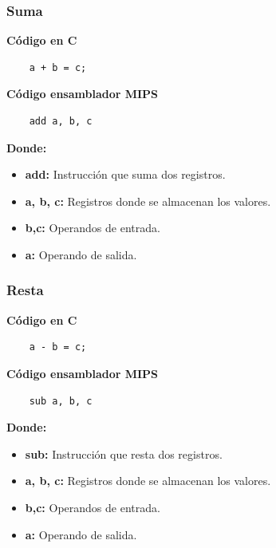 \documentclass{templateNote}
\begin{document}
\subsubsection{Suma}
\begin{tcolorbox}[colback=gray!5!white, colframe=gray!75!black, title={Código de ejemplo en C y ensamblador MIPS}]
    \begin{minipage}{0.45\textwidth}
        \textbf{Código en C}
        \begin{lstlisting}
    a + b = c;
        \end{lstlisting}
    \end{minipage}
    \hfill
    \begin{minipage}{0.45\textwidth}
        \textbf{Código ensamblador MIPS}
        \begin{lstlisting}
    add a, b, c
        \end{lstlisting}
    \end{minipage}
\end{tcolorbox}

\textbf{Donde:}
\begin{itemize}
    \item \textbf{add:} Instrucción que suma dos registros.
    \item \textbf{a, b, c:} Registros donde se almacenan los valores.
    \item \textbf{b,c:} Operandos de entrada.
    \item \textbf{a:} Operando de salida.
\end{itemize}

\subsubsection{Resta}
\begin{tcolorbox}[colback=gray!5!white, colframe=gray!75!black, title={Código de ejemplo en C y ensamblador MIPS}]
    \begin{minipage}{0.45\textwidth}
        \textbf{Código en C}
        \begin{lstlisting}
    a - b = c;
        \end{lstlisting}
    \end{minipage}
    \hfill
    \begin{minipage}{0.45\textwidth}
        \textbf{Código ensamblador MIPS}
        \begin{lstlisting}
    sub a, b, c
        \end{lstlisting}
    \end{minipage}
\end{tcolorbox}
\textbf{Donde:}
\begin{itemize}
    \item \textbf{sub:} Instrucción que resta dos registros.
    \item \textbf{a, b, c:} Registros donde se almacenan los valores.
    \item \textbf{b,c:} Operandos de entrada.
    \item \textbf{a:} Operando de salida.
\end{itemize}
\end{document}
